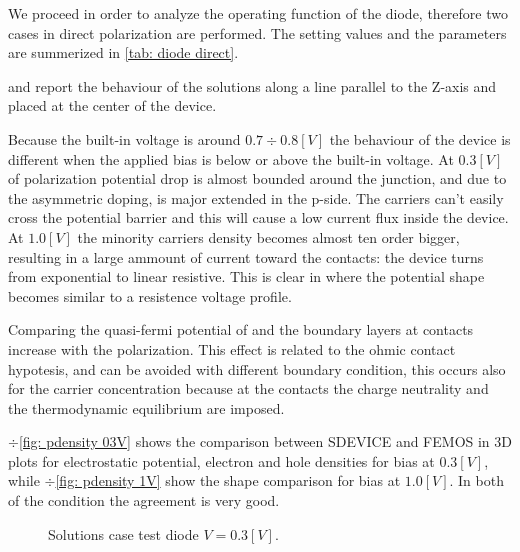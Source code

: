 We proceed in order to analyze the operating function of the diode, therefore two cases in direct polarization are performed. The setting values and the parameters are summerized in \ref{tab: diode direct}. 




 and  report the behaviour of the solutions along a line parallel to the Z-axis and placed at the center of the device. 

Because the built-in voltage is around $0.7 \div 0.8 [V]$ the behaviour of the device is different when the applied bias is below or above the built-in voltage. 
At $0.3[V]$ of polarization potential drop is almost bounded around the junction, and due to the asymmetric doping, is major extended in the p-side. The carriers can't easily cross the potential barrier and this will cause a low current flux inside the device.
At $1.0[V]$ the minority carriers density becomes almost ten order bigger, resulting in a large ammount of current toward the contacts:  the device turns from exponential to linear resistive. This is clear in  where the potential shape becomes similar to a resistence voltage profile.  

Comparing the quasi-fermi potential of  and  the boundary layers at contacts increase with the polarization. This effect is related to the ohmic contact hypotesis, and can be avoided with different boundary condition, this occurs also for the carrier concentration because at the contacts the charge neutrality and the thermodynamic equilibrium  are imposed.

$\div$\ref{fig: pdensity 03V} shows the comparison between SDEVICE and FEMOS in 3D plots for electrostatic potential, electron and hole densities for bias at $0.3[V]$, while $\div$\ref{fig: pdensity 1V} show the shape comparison for bias at $1.0[V]$. In both of the condition the agreement is very good.


\begin{figure}[!h]
\centering






\caption{Solutions case test diode $V=0.3[V]$.}
\label{fig: Solutions case test 0.3}
\end{figure}

